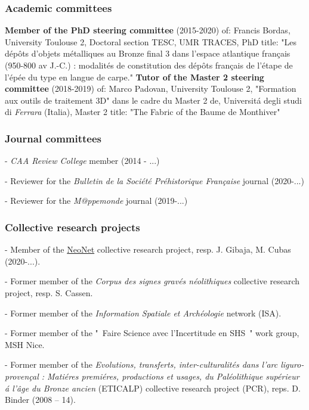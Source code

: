 \documentclass[11pt]{report} %
\begin{document}
\subsubsection*{Academic committees}

\textbf{Member of the PhD steering committee} (2015-2020) of: Francis Bordas, University Toulouse 2, Doctoral section TESC, UMR TRACES, PhD title: "Les d\'{e}p\^{o}ts d'objets m\'{e}talliques au Bronze final 3 dans l'espace atlantique fran\c{c}ais (950-800 av J.-C.) : modalit\'{e}s de constitution des d\'{e}p\^{o}ts fran\c{c}ais de l'\'{e}tape de l'\'{e}p\'{e}e du type en langue de carpe."
\smallbreak
\textbf{Tutor of the Master 2  steering committee} (2018-2019) of: Marco Padovan, University Toulouse 2, "Formation aux outils de traitement 3D" dans le cadre du Master 2 de, Universit\'{a} degli studi di \textit{Ferrara} (Italia), Master 2 title: "The Fabric of the Baume de Monthiver"

\subsubsection*{Journal committees}

-  \textit{CAA Review College} member (2014 - ...)

-  Reviewer for the \textit{Bulletin de la Soci\'{e}t\'{e} Pr\'{e}historique Fran\c{c}aise} journal (2020-...)

-  Reviewer for the \textit{M@ppemonde} journal (2019-...)

\subsubsection*{Collective research projects}

-  Member of the \href{https://redneonet.com/}{NeoNet} collective research project, resp. J. Gibaja, M. Cubas (2020-...).

-  Former member of the \textit{Corpus des signes grav\'{e}s n\'{e}olithiques} collective research project, resp. S. Cassen.

-  Former member of the \textit{Information Spatiale et Arch\'{e}ologie} network (ISA). 

-  Former member of the "~Faire Science avec l'Incertitude en SHS~" work group, MSH Nice.

-  Former member of the \textit{Evolutions, transferts, inter-culturalit\'{e}s dans l'arc liguro-proven\c{c}al : Mati\'{e}res premi\'{e}res, productions et usages, du Pal\'{e}olithique sup\'{e}rieur \'{a} l'\^{a}ge du Bronze ancien} (ETICALP) collective research project (PCR), reps. D. Binder (2008 -- 14).
\end{document}
